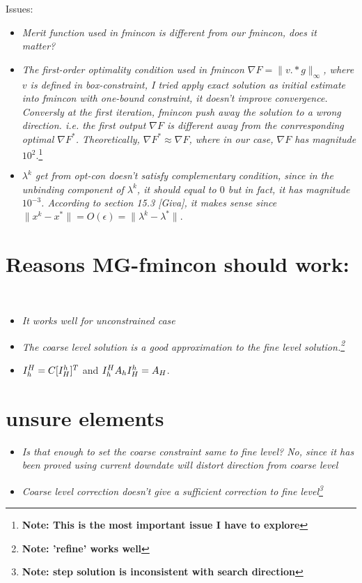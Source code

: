 \documentclass[10pt]{article}
\begin{document}
Issues:
\begin{itemize}
\item{\em Merit function used in fmincon is different from our fmincon, does it matter?}\

\item{\em The first-order optimality condition used in fmincon $\nabla F= \| v.*g\|_{\infty}$, where $v$ is defined in box-constraint, I tried apply exact solution as initial estimate into fmincon with one-bound constraint, it doesn't improve convergence. Conversly at the first iteration, fmincon push away the solution to a wrong direction. i.e. the first output $\nabla F$ is different away from the conrresponding optimal $\nabla F^{*}$. Theoretically, $\nabla F^{*}\approx \nabla F$, where in our case, $\nabla F$ has magnitude $10^{2}.$}\footnote{\bf Note: This is the most important issue I have to explore}\\

\item{\em $\lambda^{k}$ get from opt-con doesn't satisfy complementary condition, since in the unbinding component of $\lambda^{k}$, it should equal to $0$ but in fact, it has magnitude $10^{-3}$. According to section 15.3 [Giva], it makes sense since $\|x^{k}-x^{*}\|=O(\epsilon)=\|\lambda^{k}-\lambda^{*}\|.$}
\end{itemize}

\section{Reasons MG-fmincon should work:}\

\begin{itemize}
\item{\em It works well for unconstrained case}
\item{\em The coarse level solution is a good approximation to the fine level solution.\footnote{\bf Note: 'refine' works well}}
\item{$I_h^H=C[I_H^h]^{T}$ and $I_h^H A_{h} I_H^h = A_{H}$.}
\end{itemize}

\section{unsure elements}
\begin{itemize}
\item{\em Is that enough to set the coarse constraint same to fine level? No, since it has been proved using current downdate will distort direction from coarse level}
\item{\em Coarse level correction doesn't give a sufficient correction to fine level\footnote{\bf Note: step solution is inconsistent with search direction}}
\end{itemize}
\end{document}
